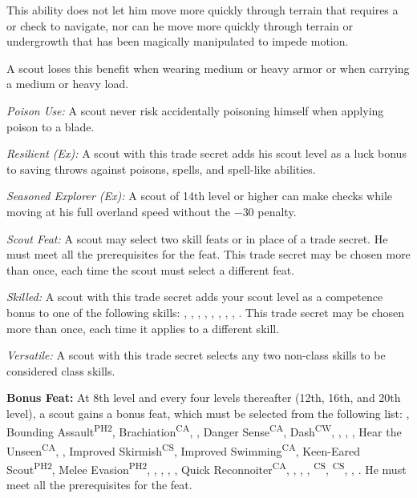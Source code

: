 This ability does not let him move more quickly through terrain that requires a  or  check to navigate, nor can he move more quickly through terrain or undergrowth that has been magically manipulated to impede motion.

A scout loses this benefit when wearing medium or heavy armor or when carrying a medium or heavy load.

\textit{Poison Use:} A scout never risk accidentally poisoning himself when applying poison to a blade.

\textit{Resilient (Ex):} A scout with this trade secret adds \onehalf his scout level as a luck bonus to saving throws against poisons, spells, and spell-like abilities.

\textit{Seasoned Explorer (Ex):} A scout of 14th level or higher can make  checks while moving at his full overland speed without the $-30$ penalty.

\textit{Scout Feat:} A scout may select two skill feats or  in place of a trade secret. He must meet all the prerequisites for the feat. This trade secret may be chosen more than once, each time the scout must select a different feat.

\textit{Skilled:} A scout with this trade secret adds \onequarter your scout level as a competence bonus to one of the following skills: , , , , , , , , . This trade secret may be chosen more than once, each time it applies to a different skill.

\textit{Versatile:} A scout with this trade secret selects any two non-class skills to be considered class skills.


\textbf{Bonus Feat:} At 8th level and every four levels thereafter (12th, 16th, and 20th level), a scout gains a bonus feat, which must be selected from the following list:
,
Bounding Assault\textsuperscript{PH2},
Brachiation\textsuperscript{CA},
,
Danger Sense\textsuperscript{CA},
Dash\textsuperscript{CW},
,
,
,
Hear the Unseen\textsuperscript{CA},
,
Improved Skirmish\textsuperscript{CS},
Improved Swimming\textsuperscript{CA},
Keen-Eared Scout\textsuperscript{PH2},
Melee Evasion\textsuperscript{PH2},
,
,
,
,
Quick Reconnoiter\textsuperscript{CA},
,
,
,
\textsuperscript{CS},
\textsuperscript{CS},
,
.
He must meet all the prerequisites for the feat.


